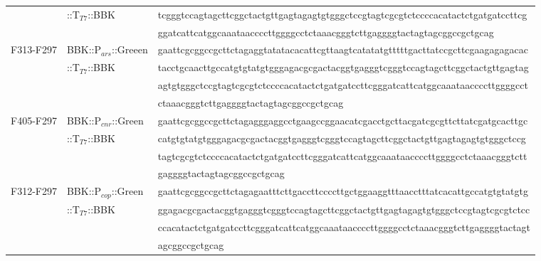 \begin{table}[h]
{\begin{tabular*}{\columnwidth}{@{}lll@{}}
\\
& ::T$_{T7}$::BBK& \MakeLowercase{TCGGGTCCAGTAGCTTCGGCTACTGTTGAGTAGAGTGTGGGCTCCGTAGTCGCGTCTCCCCACATACTCTGATGATCCTTCG}
\\
& & \MakeLowercase{GGATCATTCATGGCAAATAACCCCTTGGGGCCTCTAAACGGGTCTTGAGGGGtactagtagcggccgctgcag}
\\
F313-F297 & BBK::P$_{ars}$::Greeen & \MakeLowercase{GAATTCGCGGCCGCTTCTAGAGGTATATACACATTCGTTAAGTCATATATGTTTTTGACTTATCCGCTTCGAAGAGAGACAC}
\\
&::T$_{T7}$::BBK & \MakeLowercase{TACCTGCAACTTGCCATGTGTATGTGGGAGACGCGACTACGGTGAGGGTCGGGTCCAGTAGCTTCGGCTACTGTTGAGTAG}
\\
& & \MakeLowercase{AGTGTGGGCTCCGTAGTCGCGTCTCCCCACATACTCTGATGATCCTTCGGGATCATTCATGGCAAATAACCCCTTGGGGCCT}
\\
& & \MakeLowercase{CTAAACGGGTCTTGAGGGGtactagtagcggccgctgcag}
\\
F405-F297 & BBK::P$_{cnr}$::Green & \MakeLowercase{GAATTCGCGGCCGCTTCTAGAGggaggcctgaagccggaacatcgacctgcttacgatcgcgttcttatcgatgcacTTGC}
\\
& ::T$_{T7}$::BBK& \MakeLowercase{CATGTGTATGTGGGAGACGCGACTACGGTGAGGGTCGGGTCCAGTAGCTTCGGCTACTGTTGAGTAGAGTGTGGGCTCCG}
\\
& & \MakeLowercase{TAGTCGCGTCTCCCCACATACTCTGATGATCCTTCGGGATCATTCATGGCAAATAACCCCTTGGGGCCTCTAAACGGGTCTT}
\\
& & \MakeLowercase{GAGGGGtactagtagcggccgctgcag}
\\
F312-F297 & BBK::P$_{cop}$::Green & \MakeLowercase{GAATTCGCGGCCGCTTCTAGAGAATTTCTTGACCTTCCCCTTGCTGGAAGGTTTAACCTTTATCACATTGCCATGTGTATGTG}
\\
& ::T$_{T7}$::BBK& \MakeLowercase{GGAGACGCGACTACGGTGAGGGTCGGGTCCAGTAGCTTCGGCTACTGTTGAGTAGAGTGTGGGCTCCGTAGTCGCGTCTCC}
\\
& & \MakeLowercase{CCACATACTCTGATGATCCTTCGGGATCATTCATGGCAAATAACCCCTTGGGGCCTCTAAACGGGTCTTGAGGGGtactagt}
\\
& & \MakeLowercase{agcggccgctgcag} \\
\hline
\end{tabular*}
}{ }
\end{table}

